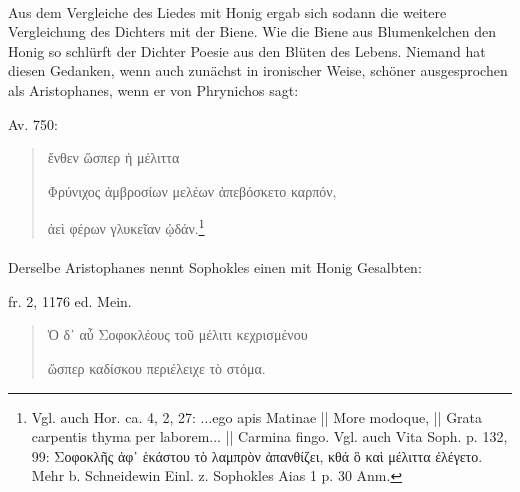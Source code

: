 \documentclass[a4paper, 11pt, oneside]{article}
\begin{document}
\paragraph{}
Aus dem Vergleiche des Liedes mit Honig ergab sich sodann die weitere Vergleichung des Dichters mit der Biene. Wie die Biene aus Blumenkelchen den Honig so schlürft der Dichter Poesie aus den Blüten des Lebens. 
Niemand hat diesen Gedanken, wenn auch zunächst in ironischer Weise, schöner ausgesprochen als Aristophanes, wenn er von Phrynichos sagt:

Av. 750:
\begin{quotation}
ἔνθεν ὥσπερ ἡ μέλιττα

Φρύνιχος ἀμβροσίων μελέων ἀπεβόσκετο καρπόν,

ἀεὶ φέρων γλυκεῖαν ᾠδάν.\footnote{Vgl. auch Hor. ca. 4, 2, 27: ...ego apis Matinae || More modoque, || Grata carpentis thyma per laborem... || Carmina fingo. Vgl. auch Vita Soph. p. 132, 99: Σοφοκλῆς ἀφ᾽ ἑκάστου τὸ λαμπρὸν ἀπανθίζει, κθά ὃ καὶ μέλιττα ἐλέγετο. Mehr b. Schneidewin Einl. z. Sophokles Aias 1 p. 30 Anm.}
\end{quotation}
\paragraph{}
Derselbe Aristophanes nennt Sophokles einen mit Honig Gesalbten:

fr. 2, 1176 ed. Mein.
\begin{quotation}
Ὁ δ᾽ αὖ Σοφοκλέους τοῦ μέλιτι κεχρισμένου

ὥσπερ καδίσκου περιέλειχε τὸ στόμα.
\end{quotation}
\end{document}
